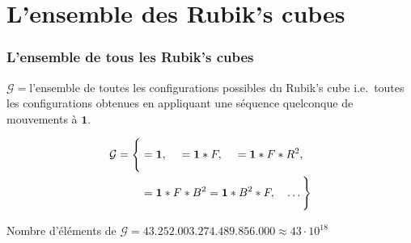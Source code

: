 \documentclass[compress]{beamer}
\newcommand{\id}{{\mathbf 1}}
\newcommand{\G}{{\mathcal G}}
\newcommand{\cube}[1]{%
  \begin{tikzpicture}[x=0.7ex,y=0.7ex, baseline=2ex]
    
  \end{tikzpicture}
}
\begin{document}
\section{L'ensemble des Rubik's cubes}
\begin{frame} \frametitle{L'ensemble de tous les Rubik's cubes}
 
  \begin{definition}
    $\G ={}$l'ensemble de toutes les configurations possibles du
    Rubik's cube i.e.\ toutes les configurations obtenues en
    appliquant une séquence quelconque de mouvements à $\id$.
  \end{definition}
 
  \begin{align*}
    \G = \Biggl\{
    &\cube{expose-id.tex} = \id, \quad
    \cube{expose-F1.tex} = \id * F, \quad
    \cube{expose-F1R2.tex} = \id * F * R^2, \\
    &\cube{expose-F1B2.tex} = \id * F * B^2 = \id * B^2 * F, \quad
    \dotsc\Biggr\}
  \end{align*}
 
  \vspace*{3ex}%
  Nombre d'éléments de $\G = 43.252.003.274.489.856.000
  \approx 43 \cdot 10^{18}$
\end{frame}
\end{document}
